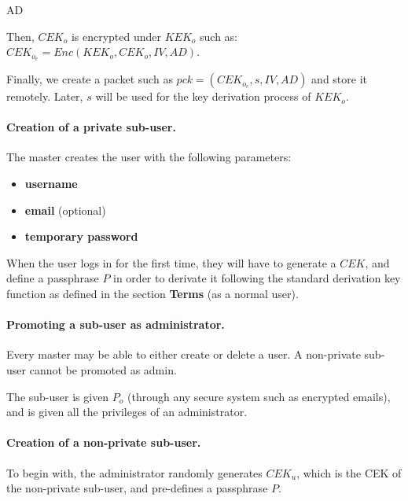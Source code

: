 AD\documentclass[a4paper,10pt]{article}
\begin{document}
Then, $CEK_o$ is encrypted under $KEK_o$ such as:
$CEK_o_e=Enc(KEK_o, CEK_o, IV,AD)$.

Finally, we create a packet such as $pck=(CEK_o_e, s, IV,AD)$ and store it remotely.
Later, $s$ will be used for the key derivation process of $KEK_o$.

\vspace{5mm}

\paragraph{Creation of a private sub-user.}

The master creates the user with the following parameters:

\begin{itemize}
	\item \textbf{username}
	\item \textbf{email} (optional)
	\item \textbf{temporary password}
\end{itemize}

When the user logs in for the first time, they will have to generate a $CEK$,
and define a passphrase $P$ in order to derivate it following the standard
derivation key function as defined in the section \textbf{Terms} (as a normal
user).

\paragraph{Promoting a sub-user as administrator.}

Every master may be able to either create or delete a user. A non-private
sub-user cannot be promoted as admin.

\vspace{5mm}

The sub-user is given $P_o$ (through any secure system such as encrypted emails),
and is given all the privileges of an administrator.

\paragraph{Creation of a non-private sub-user.}

To begin with, the administrator randomly generates $CEK_u$, which is the CEK of the
non-private sub-user, and pre-defines a passphrase $P$.

\vspace{5mm}
\end{document}
